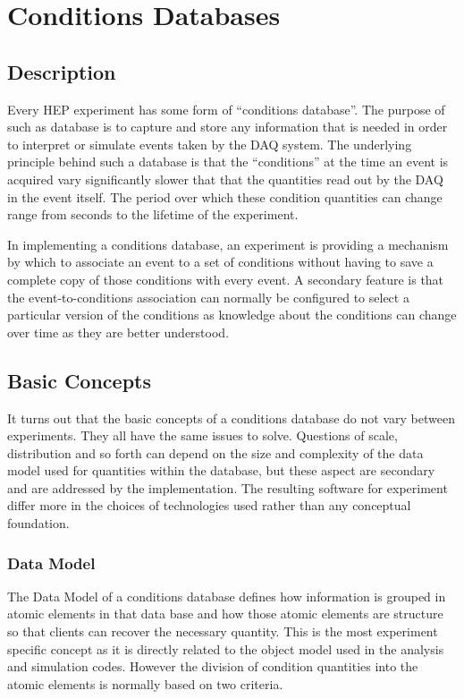 \section{Conditions Databases}



\subsection{Description}

Every HEP experiment has some form of ``conditions database''. The purpose of such as database is to capture and store any information that is needed in order to interpret or simulate events taken by the DAQ system. The underlying principle behind such a database is that the ``conditions'' at the time an event is acquired vary significantly slower that that the quantities read out by the DAQ in the event itself. The period over which these condition quantities can change range from seconds to the lifetime of the experiment.

In implementing a conditions database, an experiment is providing a mechanism by which to associate an event to a set of conditions without having to save a complete copy of those conditions with every event. A secondary feature is that the event-to-conditions association can normally be configured to select a particular version of the conditions as knowledge about the conditions can change over time as they are better understood.

\subsection{Basic Concepts}

It turns out that the basic concepts of a conditions database do not vary between experiments. They all have the same issues to solve. Questions of scale, distribution and so forth can depend on the size and complexity of the data model used for quantities within the database, but these aspect are secondary and are addressed by the implementation. The resulting software for experiment differ more in the choices of technologies used rather than any conceptual foundation.

\subsubsection{Data Model}

The Data Model of a conditions database defines how information is grouped in atomic elements in that data base and how those atomic elements are structure so that clients can recover the necessary quantity. This is the most experiment specific concept as it is directly related to the object model used in the analysis and simulation codes. However the division of condition quantities into the atomic elements is normally based on two criteria.

